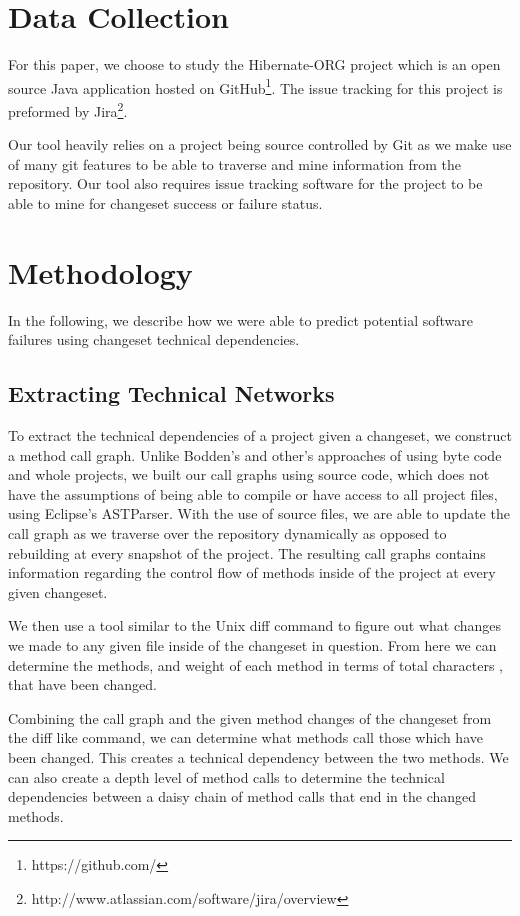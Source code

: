 \documentclass[conference]{IEEEtran}
\begin{document}
\section{Data Collection}
For this paper, we choose to study the Hibernate-ORG project which is an open source Java 
application hosted on GitHub\footnote{https://github.com/}. 
The issue tracking for this project is preformed by Jira\footnote{http://www.atlassian.com/software/jira/overview}.

Our tool heavily relies on a project being source controlled by Git as we make use of many
git features to be able to traverse and mine information from the repository. Our tool also
requires issue tracking software for the project to be able to mine for changeset success or
failure status.


\section{Methodology}
In the following, we describe how we were able to predict potential software failures using changeset
technical dependencies.

\subsection{Extracting Technical Networks}
To extract the technical dependencies of a project given a changeset, we construct a method
call graph. Unlike  Bodden's \cite{Bodden:2003:HVJ} and other's approaches of using byte code
and whole projects, we built our call graphs using source code, which does not have the assumptions
of being able to compile or have access to all project files, using Eclipse's ASTParser. 
With the use of source files, we are able
to update the call graph as we traverse over the repository dynamically as opposed to rebuilding
at every snapshot of the project. The resulting call graphs contains information regarding the control
flow of methods inside of the project at every given changeset.

We then use a tool similar to the Unix diff command to figure out what changes we made to any given
file inside of the changeset in question. From here we can determine the methods, and weight
of each method in terms of total characters , that have been changed.

Combining the call graph and the given method changes of the changeset from the diff like command,
we can determine what methods call those which have been changed. This creates a technical
dependency between the two methods. We can also create a depth level of method calls to determine
the technical dependencies between a daisy chain of method calls that end in the changed methods.
\end{document}
